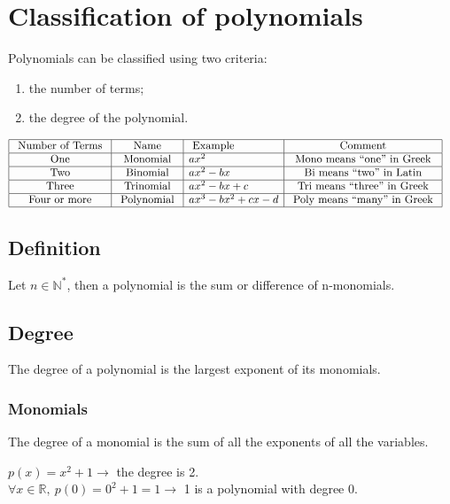 \documentclass{article}
\begin{document}
\section{Classification of polynomials}
Polynomials can be classified using two criteria: 
\begin{enumerate}
    \item the number of terms;
    \item the degree of the polynomial.
\end{enumerate}
\begin{equation}
    \begin{aligned}
        &\begin{array}{|c|c|l|c|}
        \hline \text { Number of Terms } & \text { Name } & \text { Example } & \text { Comment } \\
        \hline \text { One } & \text { Monomial } & ax^2 & \text { Mono means ``one'' in Greek } \\
        \hline \text { Two } & \text { Binomial } & ax^2-b x & \text { Bi means ``two'' in Latin } \\
        \hline \text { Three } & \text { Trinomial } & ax^2-b x+c & \text { Tri means ``three'' in Greek } \\
        \hline \text { Four or more } & \text { Polynomial } & a x^3-b x^2+c x-d & \text { Poly means ``many'' in Greek } \\
        \hline
        \end{array}
    \end{aligned}
\end{equation}

\subsection{Definition}
Let $n \in \mathbb{N^*}$, then a polynomial is the sum or difference of n-monomials. 

\subsection{Degree}
The degree of a polynomial is the largest exponent of its monomials.

\subsubsection{Monomials}
The degree of a monomial is the sum of all the exponents of all the variables.

$p(x)=x^2+1 \rightarrow$ the degree is 2.\\
$\forall x \in \mathbb{R},\ p(0)=0^2+1=1 \rightarrow$ 1 is a polynomial with degree 0.
\end{document}
